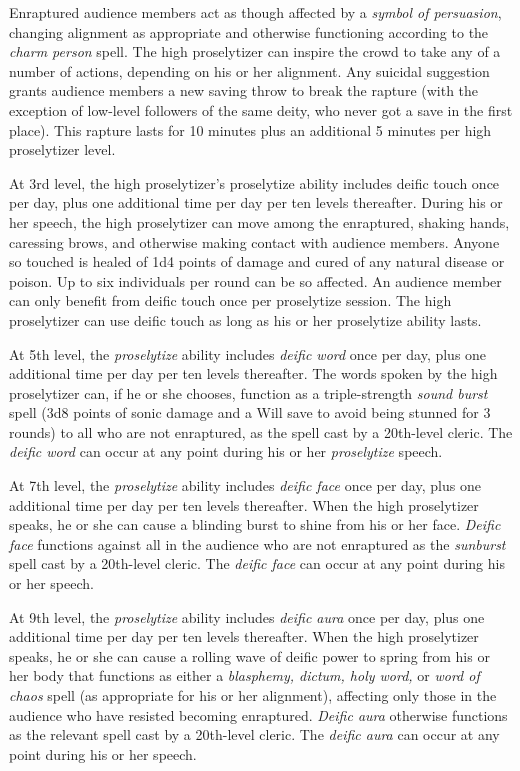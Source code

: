 \documentclass{article}
\begin{document}
Enraptured audience members act as though affected by a \textit{symbol of persuasion}, 
changing alignment as appropriate and otherwise functioning according to the \textit{charm 
person }spell. The high proselytizer can inspire the crowd to take any of a number 
of actions, depending on his or her alignment. Any suicidal suggestion grants audience 
members a new saving throw to break the rapture (with the exception of low-level 
followers of the same deity, who never got a save in the first place). This rapture 
lasts for 10 minutes plus an additional 5 minutes per high proselytizer level. 

\baselineskip=12pt
At 3rd level, the high proselytizer's proselytize ability includes deific touch 
once per day, plus one additional time per day per ten levels thereafter. During 
his or her speech, the high proselytizer can move among the enraptured, shaking 
hands, caressing brows, and otherwise making contact with audience members. Anyone 
so touched is healed of 1d4 points of damage and cured of any natural disease or 
poison. Up to six individuals per round can be so affected. An audience member 
can only benefit from deific touch once per proselytize session. The high proselytizer 
can use deific touch as long as his or her proselytize ability lasts.

At 5th level, the \textit{proselytize }ability includes \textit{deific word }once 
per day, plus one additional time per day per ten levels thereafter. The words 
spoken by the high proselytizer can, if he or she chooses, function as a triple-strength 
\textit{sound burst }spell (3d8 points of sonic damage and a Will save to avoid 
being stunned for 3 rounds) to all who are not enraptured, as the spell cast by 
a 20th-level cleric. The \textit{deific word }can occur at any point during his 
or her \textit{proselytize }speech. 

At 7th level, the \textit{proselytize }ability includes \textit{deific face }once 
per day, plus one additional time per day per ten levels thereafter. When the high 
proselytizer speaks, he or she can cause a blinding burst to shine from his or 
her face. \textit{Deific face }functions against all in the audience who are not 
enraptured as the \textit{sunburst }spell cast by a 20th-level cleric. The \textit{deific 
face }can occur at any point during his or her speech. 

At 9th level, the \textit{proselytize }ability includes \textit{deific aura }once 
per day, plus one additional time per day per ten levels thereafter. When the high 
proselytizer speaks, he or she can cause a rolling wave of deific power to spring 
from his or her body that functions as either a \textit{blasphemy, dictum, holy 
word, }or \textit{word of chaos }spell (as appropriate for his or her alignment), 
affecting only those in the audience who have resisted becoming enraptured. \textit{Deific 
aura }otherwise functions as the relevant spell cast by a 20th-level cleric. The 
\textit{deific aura }can occur at any point during his or her speech. 
\end{document}
